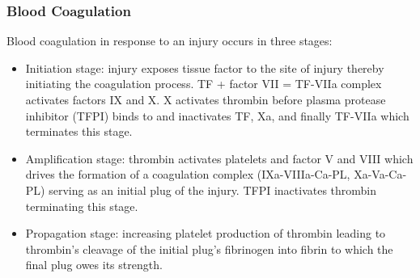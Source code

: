 \begin{frame}
  \frametitle{Blood Coagulation}
  Blood coagulation in response to an injury occurs in three stages: \begin{itemize}
  \item Initiation stage: injury exposes tissue factor to the site of injury thereby initiating the coagulation process. TF + factor VII = TF-VIIa complex activates factors IX and X. X activates thrombin before plasma protease inhibitor (TFPI) binds to and inactivates TF, Xa, and finally TF-VIIa which terminates this stage.\\
  \item Amplification stage: thrombin activates platelets and factor V and VIII which drives the formation of a coagulation complex (IXa-VIIIa-Ca-PL, Xa-Va-Ca-PL) serving as an initial plug of the injury. TFPI inactivates thrombin terminating this stage.\\
  \item Propagation stage: increasing platelet production of thrombin leading to thrombin's cleavage of the initial plug's fibrinogen into fibrin to which the final plug owes its strength.
  \end{itemize}
\end{frame}


